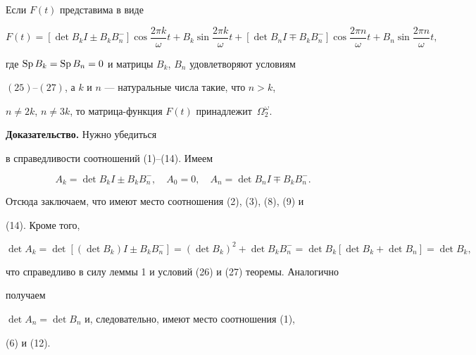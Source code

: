  


 


\begin{thm} 


Если $F(t)$ представима в виде 


$$ 


F(t)=[\det B_k I\pm B_k B^-_n] 


\cos\frac{2\pi k}{\omega}t+B_k 


\sin\frac{2\pi k}{\omega}t+[\det B_n I\mp B_k B^-_n] 


\cos\frac{2\pi n}{\omega}t+B_n 


\sin\frac{2\pi n}{\omega}t, 


$$ 


где $\operatorname{Sp} B_k=\operatorname{Sp} B_n=0$ и матрицы $B_k$, $B_n$ удовлетворяют условиям 


$(25)$--\/$(27)$, а $k$ и $n$ --- натуральные числа такие, что $n>k$, 


$n\ne2k$, $n\ne3k$, то матрица-функция $F(t)$ принадлежит~$\Omega^\omega_2$. 


\end{thm} 


 


 


{\bf Доказательство.} Нужно убедиться


в справедливости соотношений (1)--(14). Имеем 


$$ 


A_k=\det B_k I\pm B_k B^-_n,\quad A_0=0,\quad 


A_n=\det B_n I\mp B_k B^-_n. 


$$ 


Отсюда заключаем, что имеют место соотношения (2), (3), (8), (9) и 


(14). Кроме того, 


$$ 


\det A_k=\det[(\det B_k)I\pm B_k B^-_n]=(\det B_k)^2 


+\det B_k B^-_n=\det B_k[\det B_k+\det B_n]=\det B_k, 


$$ 


что справедливо в силу леммы 1 и условий (26) и (27) теоремы. Аналогично 


получаем\linebreak


$\det A_n=\det B_n$ и, следовательно, имеют место соотношения (1), 


(6) и (12). 



